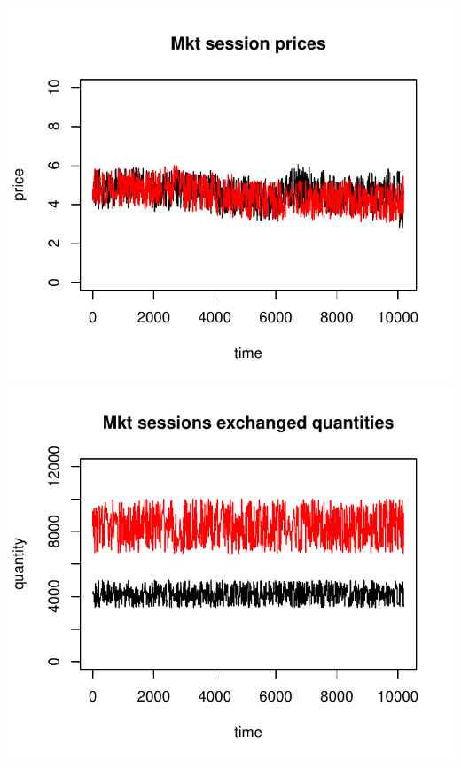 \documentclass{article}
\begin{document}
\noindent
\vskip-5mm
\hskip-1cm
\includegraphics[scale=0.5]{fig_case06_prices}
\includegraphics[scale=0.5]{fig_case06_quantities}
\end{document}
